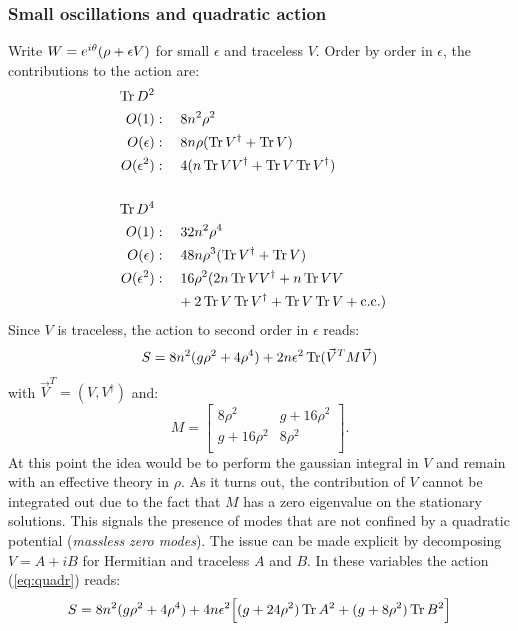 \subsubsection{Small oscillations and quadratic action}
Write $W = e^{i \theta}(\rho + \epsilon V)$ for small $\epsilon$ and traceless $V$. Order by order in $\epsilon$, the contributions to the action are:
\begin{align}
\operatorname{Tr} D^2 \notag \\
O(1)&: \quad 8n^2 \rho^2 \\
O(\epsilon)&: \quad 8n \rho ( \operatorname{Tr} V^\dagger + \operatorname{Tr} V) \\
O(\epsilon^2)&: \quad 4 (n \operatorname{Tr} V V^\dagger + \operatorname{Tr} V \operatorname{Tr} V^\dagger) \\
\\ \notag
\operatorname{Tr} D^4 \notag \\
O(1)&: \quad 32n^2 \rho^4 \\
O(\epsilon)&: \quad 48 n \rho^3 (\operatorname{Tr} V^\dagger + \operatorname{Tr} V) \\
O(\epsilon^2)&: \quad 16 \rho^2(2n \operatorname{Tr} V V^\dagger + n \operatorname{Tr} V V \\
&\phantom{:\quad \ }+2 \operatorname{Tr} V \operatorname{Tr} V^\dagger + \operatorname{Tr} V \operatorname{Tr} V + \text{c.c.}) \notag 
\end{align}
Since $V$ is traceless, the action to second order in $\epsilon$ reads:
\begin{equation}\label{eq:quadr}
S = 8n^2(g \rho^2 + 4 \rho^4) + 2n \epsilon^2 \operatorname{Tr}(\vec{V}^T M \vec{V}) 
\end{equation}
with $\vec{V}^T = (V, V^\dagger)$ and:
\begin{equation}
M = \begin{bmatrix}
    8 \rho^2 & g + 16 \rho^2 \\
    g + 16 \rho^2 & 8 \rho^2 \\
\end{bmatrix}.
\end{equation}
At this point the idea would be to perform the gaussian integral in $V$ and remain with an effective theory in $\rho$. As it turns out, the contribution of $V$ cannot be integrated out due to the fact that $M$ has a zero eigenvalue on the stationary solutions. This signals the presence of modes that are not confined by a quadratic potential (\textit{massless zero modes}). The issue can be made explicit by decomposing $V = A + iB$ for Hermitian and traceless $A$ and $B$. In these variables the action (\ref{eq:quadr}) reads:
\begin{equation}
S = 8n^2(g \rho^2 + 4 \rho^4) + 4n \epsilon^2 \Big[ (g+24\rho^2) \operatorname{Tr} A^2 + (g+8\rho^2) \operatorname{Tr} B^2 \Big]
\end{equation}
